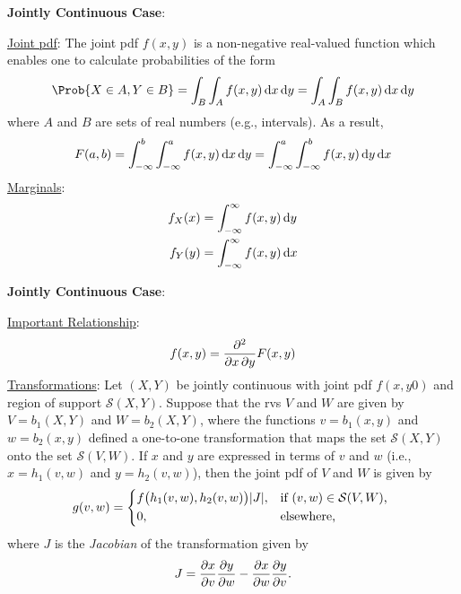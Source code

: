\begin{Regular}
    \textbf{Jointly Continuous Case}:

    \underline{Joint pdf}: The joint pdf $ f(x,y) $ is a non-negative real-valued function which enables one to calculate probabilities of the form
    \[ \Prob{X\in A,Y\in B}=\int_{B}\int_{A}f(x,y)\odif{x,y}=\int_A\int_B f(x,y)\odif{x,y}  \]
    where $ A $ and $ B $ are sets of real numbers (e.g., intervals). As a result,
    \[ F(a,b)=\int_{-\infty}^{b}\int_{-\infty}^{a}f(x,y)\odif{x,y}=\int_{-\infty}^{a}\int_{-\infty}^{b}f(x,y)\odif{y,x}   \]
    \underline{Marginals}:
    \begin{align*}
        f_X(x) & =\int_{-\infty}^{\infty}f(x,y)\odif{y} \\
        f_Y(y) & =\int_{-\infty}^{\infty}f(x,y)\odif{x}
    \end{align*}
\end{Regular}
\begin{Regular}
    \textbf{Jointly Continuous Case}:

    \underline{Important Relationship}:
    \[ f(x,y)=\pdv*{F(x,y)}{x,y} \]
    \underline{Transformations}: Let $ (X,Y) $ be jointly continuous with joint pdf $ f(x,y0) $ and region
    of support $ \mathcal{S}(X,Y) $. Suppose that the rvs $ V $ and $ W $ are given by $ V=b_1(X,Y) $ and $ W=b_2(X,Y) $,
    where the functions $ v=b_1(x,y) $ and $ w=b_2(x,y) $ defined a one-to-one transformation that maps the set $ \mathcal{S}(X,Y) $
    onto the set $ \mathcal{S}(V,W) $. If $ x $ and $ y $ are expressed in terms of $ v $ and $  w $ (i.e., $ x=h_1(v,w) $ and $ y=h_2(v,w) $),
    then the joint pdf of $ V $ and $ W $ is given by
    \[ g(v,w)=\begin{cases*}
            f\bigl(h_1(v,w),h_2(v,w)\bigr)\abs{J}, & \text{if $ (v,w)\in\mathcal{S}(V,W) $}, \\
            0,                                     & \text{elsewhere},
        \end{cases*} \]
    where $ J $ is the \emph{Jacobian} of the transformation given by
    \[ J=\pdv{x}{v}\pdv{y}{w}-\pdv{x}{w}\pdv{y}{v}. \]
\end{Regular}
\newpage
